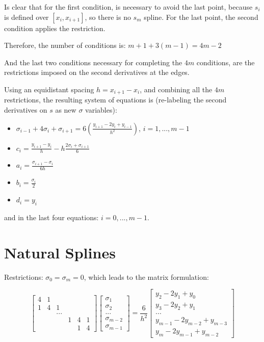 \documentclass[paper=a4, fontsize=11pt]{scrartcl} %
\numberwithin{equation}{section} %
\numberwithin{figure}{section} %
\numberwithin{table}{section} %
\begin{document}
Is clear that for the first condition, is necessary to avoid the last point, because $s_{i}$ is defined over $[x_{i}, x_{i+1}]$, so there is no $s_{m}$ spline. For the last point, the second condition applies the restriction.

Therefore, the number of conditions is: $m+1+3(m-1) = 4m-2$

And the last two conditions necessary for completing the $4m$ conditions, are the restrictions imposed on the second derivatives at the edges.

Using an equidistant spacing $h=x_{i+1}-x_{i}$, and combining all the $4m$ restrictions, the resulting system of equations is (re-labeling the second derivatives on $s$ as new $\sigma$ variables):

\begin{itemize}
\item $\sigma_{i-1}+4\sigma_{i}+\sigma_{i+1} = 6 \left( \frac{y_{i+1}-2y_{i}+y_{i-1}}{h^{2}} \right)$, \quad \quad $i=1, ..., m-1$
\item $c_{i} = \frac{y_{i+1}-y_{i}}{h}-h\frac{2\sigma_{i}+\sigma_{i+1}}{6}$
\item $a_{i} = \frac{\sigma_{i+1}-\sigma_{i}}{6h}$
\item $b_{i} = \frac{\sigma_{i}}{2}$
\item $d_{i} = y_{i}$
\end{itemize}

and in the last four equations: $i = 0, ..., m-1$.


\section{Natural Splines}

Restrictions: $\sigma_{0} = \sigma_{m} = 0$, which leads to the matrix formulation:

\begin{equation}
\begin{bmatrix}
4 & 1 &  &  &  &  \\
1 & 4 & 1 &  &  &  \\
 &  & ... &  &  &  \\
 &  &  & 1 & 4 & 1 \\
 &  &  &  & 1 & 4 \end{bmatrix}
\left[ \begin{array}{c} \sigma_1 \\ \sigma_2 \\ ... \\ \sigma_{m-2} \\ \sigma_{m-1} \end{array} \right]
=\frac{6}{h^{2}}
\left[ \begin{array}{c} y_{2}-2y_{1}+y_{0} \\ y_{3}-2y_{2}+y_{1} \\ ... \\ y_{m-1}-2y_{m-2}+y_{m-3} \\ y_{m}-2y_{m-1}+y_{m-2} \end{array} \right]
\end{equation}
\end{document}
